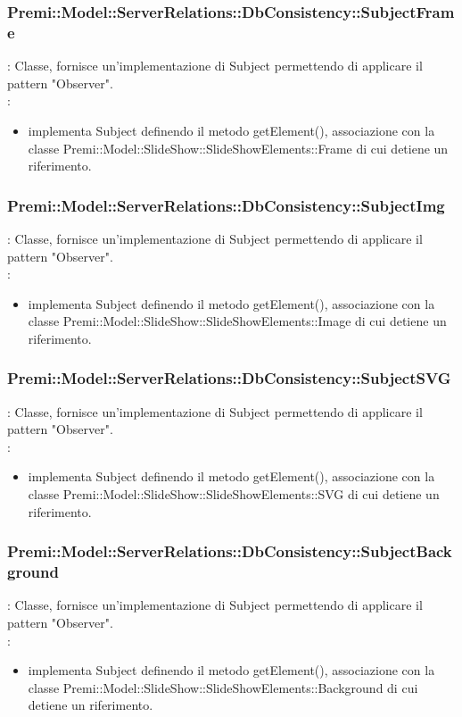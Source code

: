 {            \subsubsection{Premi::Model::ServerRelations::DbConsistency::SubjectFrame}{
				\textbf{\tipo}: Classe, fornisce un’implementazione di Subject permettendo di applicare il pattern "Observer".\\	
				\textbf{\relaz}: 
				\begin{itemize}
					\item implementa Subject definendo il metodo getElement(), associazione con la classe Premi::Model::SlideShow::SlideShowElements::Frame di cui detiene un riferimento.
				\end{itemize}	
            }
            
            \subsubsection{Premi::Model::ServerRelations::DbConsistency::SubjectImg}{
				\textbf{\tipo}: Classe, fornisce un’implementazione di Subject permettendo di applicare il pattern "Observer".\\	
				\textbf{\relaz}: 
				\begin{itemize}
					\item implementa Subject definendo il metodo getElement(), associazione con la classe Premi::Model::SlideShow::SlideShowElements::Image di cui detiene un riferimento.
				\end{itemize}	
            }
            
            \subsubsection{Premi::Model::ServerRelations::DbConsistency::SubjectSVG}{
				\textbf{\tipo}: Classe, fornisce un’implementazione di Subject permettendo di applicare il pattern "Observer".\\	
				\textbf{\relaz}: 
				\begin{itemize}
					\item implementa Subject definendo il metodo getElement(), associazione con la classe Premi::Model::SlideShow::SlideShowElements::SVG di cui detiene un riferimento.
				\end{itemize}	
            }
            
             \subsubsection{Premi::Model::ServerRelations::DbConsistency::SubjectBackground}{
				\textbf{\tipo}: Classe, fornisce un’implementazione di Subject permettendo di applicare il pattern "Observer".\\	
				\textbf{\relaz}: 
				\begin{itemize}
					\item implementa Subject definendo il metodo getElement(), associazione con la classe Premi::Model::SlideShow::SlideShowElements::Background di cui detiene un riferimento.
				\end{itemize}	
            }

}

